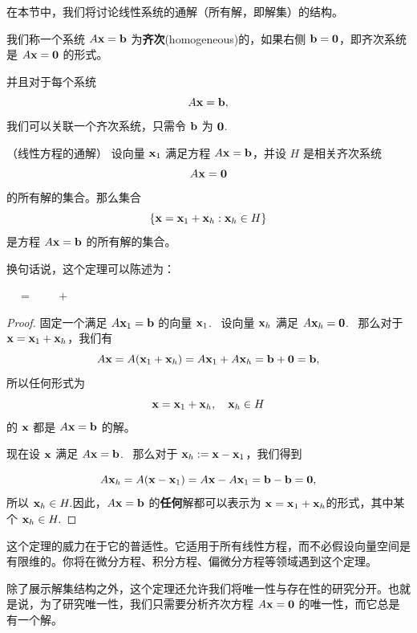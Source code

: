 在本节中，我们将讨论线性系统的通解（所有解，即解集）的结构。

我们称一个系统 $A \mathbf{x} = \mathbf{b}$ 为\textbf{齐次}(homogeneous)的，如果右侧 $\mathbf{b} = \mathbf{0}$，即齐次系统是 $A \mathbf{x} = \mathbf{0}$ 的形式。

并且对于每个系统 $$A \mathbf{x} = \mathbf{b},$$
我们可以关联一个齐次系统，只需令 $\mathbf{b}$ 为 $\mathbf{0}$. ~

\begin{theorem}\label{stmt:02-06-01} （线性方程的通解） 设向量 $\mathbf{x}_1$ 满足方程 $A \mathbf{x} = \mathbf{b}$，并设 $H$ 是相关齐次系统 $$A \mathbf{x} = \mathbf{0}$$
的所有解的集合。那么集合
$$\{\mathbf{x} = \mathbf{x}_1 + \mathbf{x}_h : \mathbf{x}_h \in H\}$$
是方程 $A \mathbf{x} = \mathbf{b}$ 的所有解的集合。\end{theorem}

换句话说，这个定理可以陈述为：

 ~~$=$~~  ~~$+$~~ 

\begin{proof} 固定一个满足 $A \mathbf{x}_1 = \mathbf{b}$ 的向量 $\mathbf{x}_1$. ~设向量 $\mathbf{x}_h$ 满足 $A \mathbf{x}_h = \mathbf{0}$. ~那么对于 $\mathbf{x} = \mathbf{x}_1 + \mathbf{x}_h$，我们有
$$A \mathbf{x} = A(\mathbf{x}_1 + \mathbf{x}_h) = A \mathbf{x}_1 + A \mathbf{x}_h = \mathbf{b} + \mathbf{0} = \mathbf{b},$$
所以任何形式为
$$\mathbf{x} = \mathbf{x}_1 + \mathbf{x}_h,\quad \mathbf{x}_h \in H$$
的 $\mathbf{x}$ 都是 $A \mathbf{x} = \mathbf{b}$ 的解。

现在设 $\mathbf{x}$ 满足 $A \mathbf{x} = \mathbf{b}$. ~那么对于 $\mathbf{x}_h := \mathbf{x} - \mathbf{x}_1$，我们得到

$$A \mathbf{x}_h = A(\mathbf{x} - \mathbf{x}_1) = A \mathbf{x} - A \mathbf{x}_1 = \mathbf{b} - \mathbf{b} = \mathbf{0},$$
所以 $\mathbf{x}_h \in H.$因此，$A \mathbf{x} = \mathbf{b}$ 的\textbf{任何}解都可以表示为 $\mathbf{x} = \mathbf{x}_1 + \mathbf{x}_h$的形式，其中某个 $\mathbf{x}_h \in H.$\end{proof}

这个定理的威力在于它的普适性。它适用于所有线性方程，而不必假设向量空间是有限维的。你将在微分方程、积分方程、偏微分方程等领域遇到这个定理。

除了展示解集结构之外，这个定理还允许我们将唯一性与存在性的研究分开。也就是说，为了研究唯一性，我们只需要分析齐次方程 $A \mathbf{x} = \mathbf{0}$ 的唯一性，而它总是有一个解。

